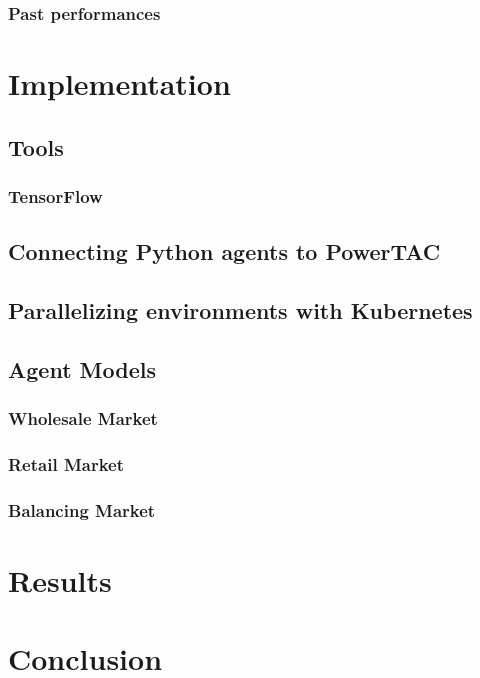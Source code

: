 \subsection{Past performances}



\chapter{Implementation}
\section{Tools}
\subsection{TensorFlow}
\section{Connecting Python agents to PowerTAC}
\section{Parallelizing environments with Kubernetes}
\section{Agent Models}
\subsection{Wholesale Market}
\subsection{Retail Market}
\subsection{Balancing Market}

\chapter{Results}
\chapter{Conclusion}



